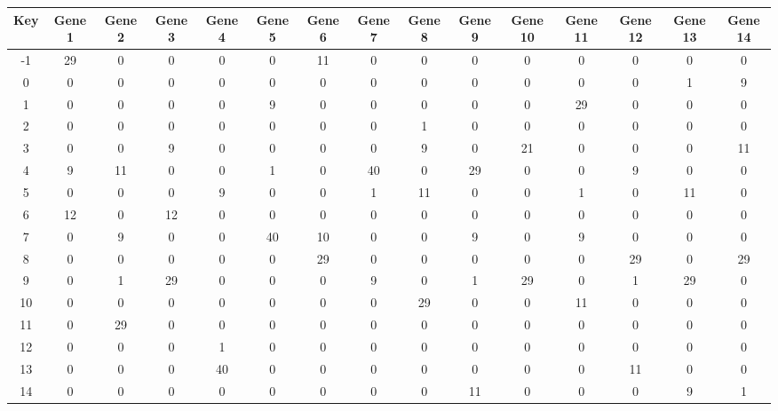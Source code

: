 \begin{tabular}{|c|c|c|c|c|c|c|c|c|c|c|c|c|c|c|}
\hline
Key & Gene 1 & Gene 2 & Gene 3 & Gene 4 & Gene 5 & Gene 6 & Gene 7 & Gene 8 & Gene 9 & Gene 10 & Gene 11 & Gene 12 & Gene 13 & Gene 14 \\
\hline
-1 & 29 & 0 & 0 & 0 & 0 & 11 & 0 & 0 & 0 & 0 & 0 & 0 & 0 & 0 \\
0 & 0 & 0 & 0 & 0 & 0 & 0 & 0 & 0 & 0 & 0 & 0 & 0 & 1 & 9 \\
1 & 0 & 0 & 0 & 0 & 9 & 0 & 0 & 0 & 0 & 0 & 29 & 0 & 0 & 0 \\
2 & 0 & 0 & 0 & 0 & 0 & 0 & 0 & 1 & 0 & 0 & 0 & 0 & 0 & 0 \\
3 & 0 & 0 & 9 & 0 & 0 & 0 & 0 & 9 & 0 & 21 & 0 & 0 & 0 & 11 \\
4 & 9 & 11 & 0 & 0 & 1 & 0 & 40 & 0 & 29 & 0 & 0 & 9 & 0 & 0 \\
5 & 0 & 0 & 0 & 9 & 0 & 0 & 1 & 11 & 0 & 0 & 1 & 0 & 11 & 0 \\
6 & 12 & 0 & 12 & 0 & 0 & 0 & 0 & 0 & 0 & 0 & 0 & 0 & 0 & 0 \\
7 & 0 & 9 & 0 & 0 & 40 & 10 & 0 & 0 & 9 & 0 & 9 & 0 & 0 & 0 \\
8 & 0 & 0 & 0 & 0 & 0 & 29 & 0 & 0 & 0 & 0 & 0 & 29 & 0 & 29 \\
9 & 0 & 1 & 29 & 0 & 0 & 0 & 9 & 0 & 1 & 29 & 0 & 1 & 29 & 0 \\
10 & 0 & 0 & 0 & 0 & 0 & 0 & 0 & 29 & 0 & 0 & 11 & 0 & 0 & 0 \\
11 & 0 & 29 & 0 & 0 & 0 & 0 & 0 & 0 & 0 & 0 & 0 & 0 & 0 & 0 \\
12 & 0 & 0 & 0 & 1 & 0 & 0 & 0 & 0 & 0 & 0 & 0 & 0 & 0 & 0 \\
13 & 0 & 0 & 0 & 40 & 0 & 0 & 0 & 0 & 0 & 0 & 0 & 11 & 0 & 0 \\
14 & 0 & 0 & 0 & 0 & 0 & 0 & 0 & 0 & 11 & 0 & 0 & 0 & 9 & 1 \\
\hline
\end{tabular}